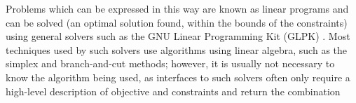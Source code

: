 Problems which can be expressed in this way are known as linear programs and can be solved (an optimal solution found, within the bounds of the constraints) using general solvers such as the GNU Linear Programming Kit (GLPK) \cite{glpk}. Most techniques used by such solvers use algorithms using linear algebra, such as the simplex and branch-and-cut methods; however, it is usually not necessary to know the algorithm being used, as interfaces to such solvers often only require a high-level description of objective and constraints and return the combination 
